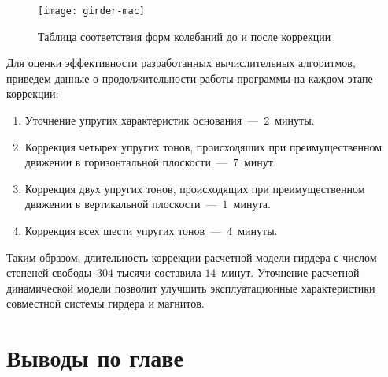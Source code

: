 \begin{figure}[!htb]
	\centering
	\texttt{[image: girder-mac]}
	\caption{Таблица соответствия форм колебаний до и после коррекции} \label{fig:girder-mac}
\end{figure}

Для оценки эффективности разработанных вычислительных алгоритмов, приведем данные о продолжительности работы программы на каждом этапе коррекции:
\begin{enumerate}
	\item Уточнение упругих характеристик основания~---~$ 2 $~минуты.
	\item Коррекция четырех упругих тонов, происходящих при преимущественном движении в горизонтальной плоскости~---~$ 7 $~минут.
	\item Коррекция двух упругих тонов, происходящих при преимущественном движении в вертикальной плоскости~---~$ 1 $~минута.
	\item Коррекция всех шести упругих тонов~---~$ 4 $~минуты.
\end{enumerate}

Таким образом, длительность коррекции расчетной модели гирдера с числом степеней свободы~$ 304 $ тысячи составила $ 14 $~минут. Уточнение расчетной динамической модели позволит улучшить эксплуатационные характеристики совместной системы гирдера и магнитов.

\section{Выводы по главе \thechapter}

